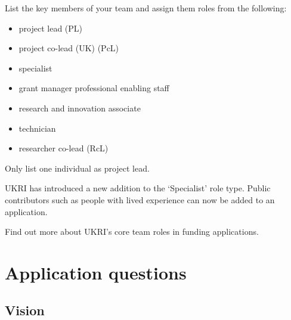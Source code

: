 \documentclass[11pt]{article}
\newenvironment{instruction}{%
    \begin{tcolorbox}[breakable,colback=red!5,colframe=red,title=Instruction]%
	}{%
    	\end{tcolorbox}%
	}
\begin{document}
\begin{instruction}
List the key members of your team and assign them roles from the following:

\begin{itemize}
	\item project lead (PL)
	\item project co-lead (UK) (PcL)
	\item specialist
	\item grant manager professional enabling staff
	\item research and innovation associate
	\item technician
	\item researcher co-lead (RcL)
\end{itemize}

Only list one individual as project lead.

UKRI has introduced a new addition to the ‘Specialist’ role type. Public
contributors such as people with lived experience can now be added to an
application.

Find out more about UKRI’s core team roles in funding applications.

\end{instruction}

% 

\pagebreak
\section{Application questions}

\subsection{Vision}
\end{document}
